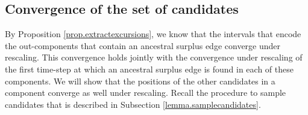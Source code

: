 
\subsection{Convergence of the set of candidates}
By Proposition \ref{prop.extractexcursions}, we know that the intervals that encode the out-components that contain an ancestral surplus edge converge under rescaling. This convergence holds jointly with the convergence under rescaling of the first time-step at which an ancestral surplus edge is found in each of these components. We will show that the positions of the other candidates in a component converge as well under rescaling. Recall the procedure to sample candidates that is described in Subsection \ref{lemma.samplecandidates}. 


